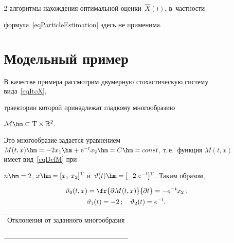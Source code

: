 \begin{multicols}{2}
алгоритмы нахождения оптимальной оценки~$\hat X(t)$, в~частности 

формула~\eqref{eqParticleEstimation} здесь не применима.



\vspace*{-4pt}



\section{Модельный пример}



В качестве примера рассмотрим двумерную стохастическую систему вида~\eqref{eqItoX}, 

траектории которой принадлежат гладкому многообразию 

$\mathcal{M} \hm\subset \mathrm{T} \times \mathbb{R}^2$. 

Это многообразие задается уравнением $M(t,x) \hm= -2 x_1 \hm+ \mathrm{e}^{-t} x_2 

\hm= C \hm= {const}$, т.\,е.\ функция $M(t,x)$ имеет вид~\eqref{eqDefM} при 

$n \hm= 2$, $x \hm= [  x_1 \ x_2 ]^\trans$ и~$\vartheta(t) \hm= 

[ -2 \  \mathrm{e}^{-t}]^\trans$. Таким образом,

\begin{gather*}

  \vartheta_0(t,x) = \fr{\partial M(t,x)}{\partial t} = -{e}^{-t} x_2\,;\\ 

   \vartheta_1(t) = -2\,;\quad \vartheta_2(t) = {e}^{-t}.

\end{gather*}



\begin{table}[b]\small %

\begin{center}





\begin{tabular}{|c|c|c|}

\multicolumn{3}{c}{Отклонения от заданного многообразия}\\

\multicolumn{3}{c}{\ }\\[-6pt]

  \hline


\end{tabular}
\end{center}
\end{table}
\end{multicols}
